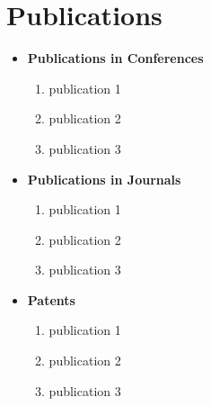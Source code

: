 \documentclass[12pt,a4paper,oneside]{report}
\begin{document}
\newpage
\section{Publications}
\begin{itemize}
    \item \large{\textbf{Publications in Conferences}}
\begin{enumerate}
 \item publication 1
 \item publication 2
 \item publication 3
\end{enumerate}

    \item \large{\textbf{Publications in Journals}}
\begin{enumerate}
 \item publication 1
 \item publication 2
 \item publication 3
\end{enumerate}

    \item \large{\textbf{Patents}}
\begin{enumerate}
 \item publication 1
 \item publication 2
 \item publication 3
\end{enumerate}

\end{itemize}




\end{document}
